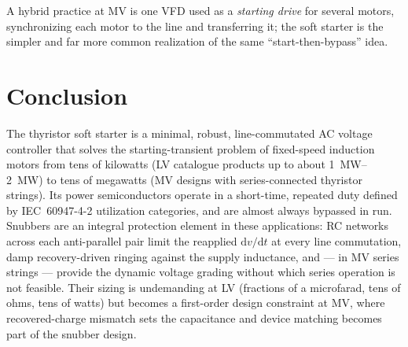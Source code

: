 \documentclass[11pt,a4paper]{article}
\begin{document}
A hybrid practice at MV is one VFD used as a \emph{starting drive} for
several motors, synchronizing each motor to the line and transferring it;
the soft starter is the simpler and far more common realization of the same
``start-then-bypass'' idea.

\section{Conclusion}

The thyristor soft starter is a minimal, robust, line-commutated AC voltage
controller that solves the starting-transient problem of fixed-speed
induction motors from tens of kilowatts (LV catalogue products up to about
\SIrange{1}{2}{\mega\watt}) to tens of megawatts (MV designs with
series-connected thyristor strings). Its power semiconductors operate in a
short-time, repeated duty defined by IEC~60947-4-2 utilization categories,
and are almost always bypassed in run. Snubbers are an integral protection
element in these applications: RC networks across each anti-parallel pair
limit the reapplied $\mathrm{d}v/\mathrm{d}t$ at every line commutation,
damp recovery-driven ringing against the supply inductance, and --- in MV
series strings --- provide the dynamic voltage grading without which series
operation is not feasible. Their sizing is undemanding at LV (fractions of a
microfarad, tens of ohms, tens of watts) but becomes a first-order design
constraint at MV, where recovered-charge mismatch sets the capacitance and
device matching becomes part of the snubber design.
\end{document}
